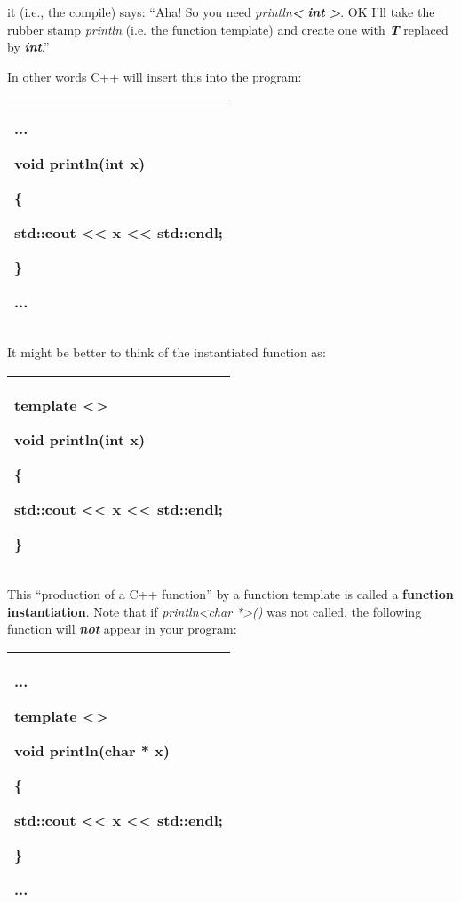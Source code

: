 \documentclass[
]{article}
\begin{document}
it (i.e., the compile) says: ``Aha! So you need
\emph{println\textbf{\textless{} }\textbf{int }\textbf{\textgreater{}}}.
OK I'll take the rubber stamp \emph{println} (i.e. the function
template) and create one with \emph{\textbf{T}} replaced by
\emph{\textbf{int}}.''

In other words C++ will insert this into the program:

\begin{longtable}[]{@{}l@{}}
\toprule
\endhead
\begin{minipage}[t]{0.97\columnwidth}\raggedright
...

void println(\textbf{int} x)

\{

std::cout \textless\textless{} x \textless\textless{} std::endl;

\}

...\strut
\end{minipage}\tabularnewline
\bottomrule
\end{longtable}

It might be better to think of the instantiated function as:

\begin{longtable}[]{@{}l@{}}
\toprule
\endhead
\begin{minipage}[t]{0.97\columnwidth}\raggedright
template \textless\textgreater{}

void println(\textbf{int} x)

\{

std::cout \textless\textless{} x \textless\textless{} std::endl;

\} \strut
\end{minipage}\tabularnewline
\bottomrule
\end{longtable}

This ``production of a C++ function'' by a function template is called a
\textbf{function instantiation}. Note that if
\emph{println\textless char *\textgreater()} was not called, the
following function will \emph{\textbf{not}} appear in your program:

\begin{longtable}[]{@{}l@{}}
\toprule
\endhead
\begin{minipage}[t]{0.97\columnwidth}\raggedright
...

template \textless\textgreater{}

void println(char * x)

\{

std::cout \textless\textless{} x \textless\textless{} std::endl;

\}

...\strut
\end{minipage}\tabularnewline
\bottomrule
\end{longtable}
\end{document}
